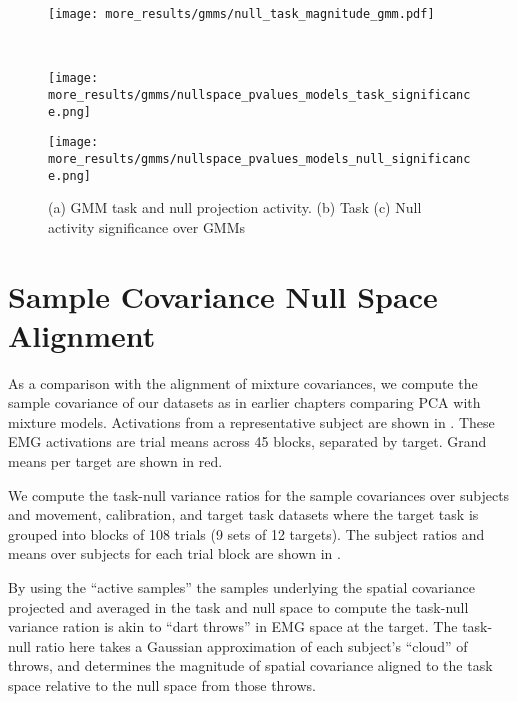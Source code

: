 \documentclass[../main.tex]{subfiles}
\begin{document}
    \begin{figure}[H]%
      \centering
      \begin{minipage}{\textwidth}
        \centering
        \texttt{[image: more\_results/gmms/null\_task\_magnitude\_gmm.pdf]}
        \subcaption{}
      \end{minipage}\\%
      \begin{minipage}{0.44\textwidth}
        \centering
        \texttt{[image: more\_results/gmms/nullspace\_pvalues\_models\_task\_significance.png]}
        \subcaption{}
      \end{minipage}%
      \hspace{-0.5cm}
      \begin{minipage}{0.49\textwidth}
        \centering
        \texttt{[image: more\_results/gmms/nullspace\_pvalues\_models\_null\_significance.png]}
        \subcaption{}
      \end{minipage}
      \caption[GMM task and null projection activity]{(a) GMM task and null projection activity. (b) Task (c) Null activity significance over GMMs}\label{fig:gmm_null_task_magnitude}
    \end{figure}
    
    
    
    
    
    
  \section{Sample Covariance Null Space Alignment}
  
  As a comparison with the alignment of mixture covariances, we compute the sample covariance of our datasets as in earlier chapters comparing PCA with mixture models. Activations from a representative subject are shown in . These EMG activations are trial means across 45 blocks, separated by target. Grand means per target are shown in red.
  
  We compute the task-null variance ratios for the sample covariances over subjects and movement, calibration, and target task datasets where the target task is grouped into blocks of 108 trials (9 sets of 12 targets). The subject ratios and means over subjects for each trial block are shown in .
  
  By using the ``active samples'' the samples underlying the spatial covariance projected and averaged in the task and null space to compute the task-null variance ration is akin to ``dart throws'' in EMG space at the target. The task-null ratio here takes a Gaussian approximation of each subject's ``cloud'' of throws, and determines the magnitude of spatial covariance aligned to the task space relative to the null space from those throws.
  
\end{document}
